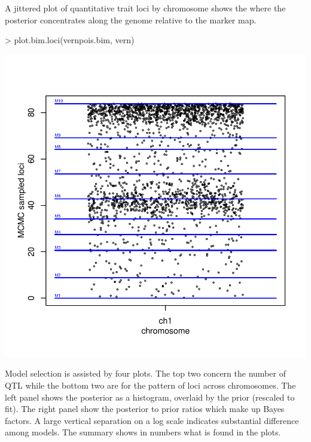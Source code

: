 \documentclass{article}
\begin{document}
A jittered plot of quantitative trait loci by chromosome shows the
where the posterior concentrates along the genome relative to the
marker map.

\begin{Schunk}
\begin{Sinput}
> plot.bim.loci(vernpois.bim, vern)
\end{Sinput}
\end{Schunk}
\includegraphics{bim_summary-006}

Model selection is assisted by four plots. The top two concern the
number of QTL while the bottom two are for the pattern of loci across
chromosomes. The left panel shows the posterior as a histogram,
overlaid by the prior (rescaled to fit). The right panel show the
posterior to prior ratios which make up Bayes factors. A large
vertical separation on a log scale indicates substantial difference
among models. The summary shows in numbers what is found in the plots.
\end{document}
